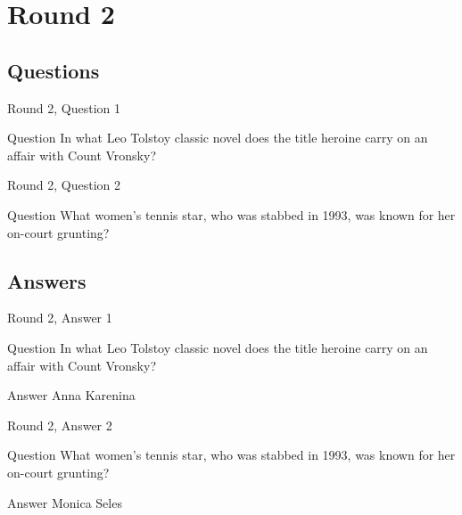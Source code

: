 \documentclass[11pt]{beamer}
\begin{document}
\section{Round 2}

\subsection{Questions}

\begin{frame}[t]{Round 2, Question 1}
  \vspace{2em}
  \begin{block}{Question}
    In what Leo Tolstoy classic novel does the title heroine carry on an affair with Count Vronsky\@?
  \end{block}
\end{frame}


\begin{frame}[t]{Round 2, Question 2}
  \vspace{2em}
  \begin{block}{Question}
    What women's tennis star, who was stabbed in 1993, was known for her on-court grunting\@?
  \end{block}
\end{frame}

\subsection{Answers}

\begin{frame}[t]{Round 2, Answer 1}
  \vspace{2em}
  \begin{block}{Question}
    In what Leo Tolstoy classic novel does the title heroine carry on an affair with Count Vronsky\@?
  \end{block}
  \pause{}
  \begin{block}{Answer}
    Anna Karenina
  \end{block}
\end{frame}


\begin{frame}[t]{Round 2, Answer 2}
  \vspace{2em}
  \begin{block}{Question}
    What women's tennis star, who was stabbed in 1993, was known for her on-court grunting\@?
  \end{block}
  \pause{}
  \begin{block}{Answer}
    Monica Seles
  \end{block}
\end{frame}
\end{document}
